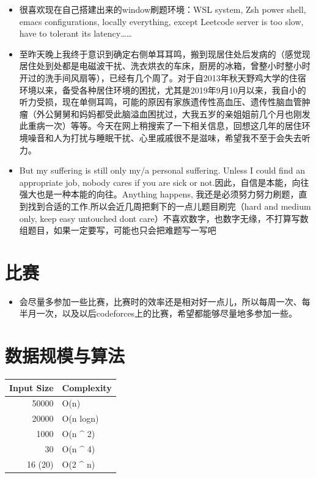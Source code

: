 \documentclass[9pt, b5paaper]{book}
\begin{document}
\begin{itemize}
\item 很喜欢现在自己搭建出来的window刷题环境：WSL system, Zsh power shell, emacs configurations, locally everything, except Leetcode server is too slow, have to tolerant its latency\ldots{}\ldots{}

\item 至昨天晚上我终于意识到确定右侧单耳耳鸣，搬到现居住处后发病的（感觉现居住处到处都是电磁波干扰、洗衣烘衣的车床，厨房的冰箱，曾整小时整小时开过的洗手间风扇等），已经有几个周了。对于自2013年秋天野鸡大学的住宿环境以来，备受各种居住环境的困扰，尤其是2019年9月10月以来，我自小的听力受损，现在单侧耳鸣，可能的原因有家族遗传性高血压、遗传性脑血管肿瘤（外公舅舅和妈妈都受此脑溢血困扰过，大我五岁的亲姐姐前几个月也刚发此重病一次）等等。今天在网上稍搜索了一下相关信息，回想这几年的居住环境噪音和人为打扰与睡眠干扰、心里戚戚很不是滋味，希望我不至于会失去听力。
\item But my suffering is still only my/a personal suffering. Unless I could find an appropriate job, nobody cares if you are sick or not.因此，自信是本能，向往强大也是一种本能的向往。Anything happens, 我还是必须努力努力刷题，直到找到合适的工作.所以会近几周把剩下的一点儿题目刷完（hard and medium only, keep easy untouched dont care）不喜欢数字，也数字无缘，不打算写数组题目，如果一定要写，可能也只会把难题写一写吧
\end{itemize}

\section{比赛}
\label{sec-1-2}
\begin{itemize}
\item 会尽量多参加一些比赛，比赛时的效率还是相对好一点儿，所以每周一次、每半月一次，以及以后codeforces上的比赛，希望都能够尽量地多参加一些。
\end{itemize}

\section{数据规模与算法}
\label{sec-1-3}
\begin{center}
\begin{tabular}{rl}
\hline
Input Size & Complexity\\
\hline
50000 & O(n)\\
20000 & O(n logn)\\
\hline
1000 & O(n \^{} 2)\\
30 & O(n \^{} 4)\\
16 (20) & O(2 \^{} n)\\
\hline
\end{tabular}
\end{center}
\end{document}
